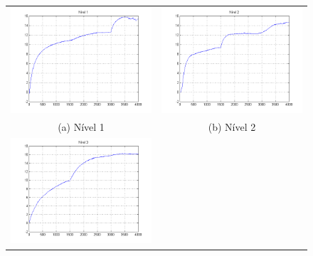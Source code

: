\begin{figure}[H]
	\centering
	\begin{tabular}{cc}
		\includegraphics[height=0.15\paperheight,keepaspectratio]{img/sim1_h1.png} &
		\includegraphics[height=0.15\paperheight,keepaspectratio]{img/sim1_h2.png} \\
		(a) Nível 1 &
		(b) Nível 2 \\
		\includegraphics[height=0.15\paperheight,keepaspectratio]{img/sim1_h3.png} &

\end{tabular}
\end{figure}
